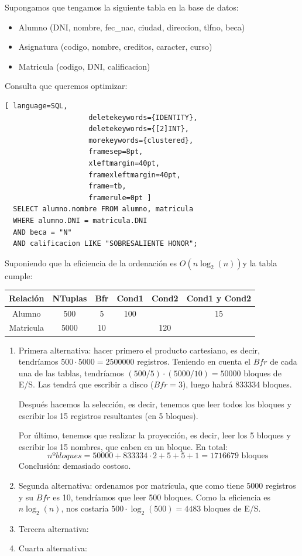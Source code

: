 \begin{example}
Supongamos que tengamos la siguiente tabla en la base de datos:
\begin{itemize}
\item Alumno (DNI, nombre, fec\_nac, ciudad, direccion, tlfno, beca)
\item Asignatura (codigo, nombre, creditos, caracter, curso)
\item Matricula (codigo, DNI, calificacion)
\end{itemize}

Consulta que queremos optimizar:
\begin{lstlisting}[ language=SQL,
                    deletekeywords={IDENTITY},
                    deletekeywords={[2]INT},
                    morekeywords={clustered},
                    framesep=8pt,
                    xleftmargin=40pt,
                    framexleftmargin=40pt,
                    frame=tb,
                    framerule=0pt ]
  SELECT alumno.nombre FROM alumno, matricula 
  WHERE alumno.DNI = matricula.DNI 
  AND beca = "N" 
  AND calificacion LIKE "SOBRESALIENTE HONOR";
\end{lstlisting}

Suponiendo que la eficiencia de la ordenación es $O(n\log_2(n))$y la tabla cumple:
\begin{center}
\begin{tabular}{|c|c|c|c|c|c|}
\hline 
Relación & NTuplas & Bfr & Cond1 & Cond2 & Cond1 y Cond2 \\ 
\hline 
Alumno & 500 & 5 & 100 &  & 15 \\ 
\hline 
Matricula & 5000 & 10 & & 120 &  \\ 
\hline 
\end{tabular}
\end{center}

\begin{enumerate}
\item Primera alternativa: hacer primero el producto cartesiano, es decir, tendríamos $500\cdot5000=2500000$ registros. Teniendo en cuenta el $Bfr$ de cada una de las tablas, tendríamos $(500/5)\cdot(5000/10)=50000$ bloques de E/S. Las tendrá que escribir a disco ($Bfr=3$), luego habrá 833334 bloques.

Después hacemos la selección, es decir, tenemos que leer todos los bloques y escribir los 15 registros resultantes (en 5 bloques).

Por último, tenemos que realizar la proyección, es decir, leer los 5 bloques y escribir los 15 nombres, que caben en un bloque. En total:
\[
nºbloques=50000+833334\cdot 2+5+5+1=1716679 \text{ bloques }
\]
Conclusión: demasiado costoso.
\item Segunda alternativa: ordenamos por matrícula, que como tiene 5000 registros y su $Bfr$ es 10, tendríamos que leer 500 bloques. Como la eficiencia es $n\log_2(n)$, nos costaría $500\cdot\log_2(500)=4483$ bloques de E/S.
\item Tercera alternativa:
\item Cuarta alternativa:
\end{enumerate}


\end{example}
